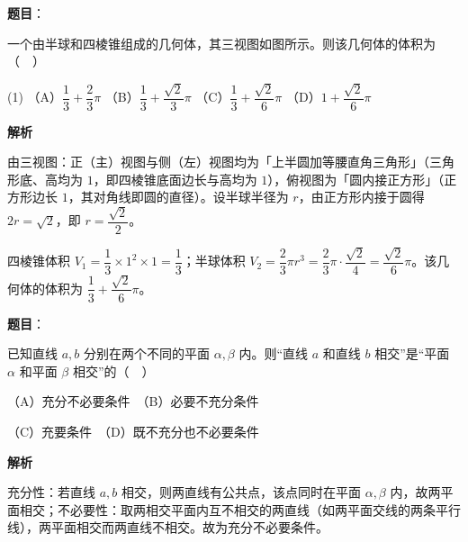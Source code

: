 \begin{answer}

\textbf{题目}：

一个由半球和四棱锥组成的几何体，其三视图如图所示。则该几何体的体积为（　）
\nopagebreak[4]
\begin{center}\end{center}
\nopagebreak[4]
\begin{gkopts}(1)
\task （A）\(\dfrac{1}{3}+\dfrac{2}{3}\pi\)
\task （B）\(\dfrac{1}{3}+\dfrac{\sqrt{2}}{3}\pi\)
\task （C）\(\dfrac{1}{3}+\dfrac{\sqrt{2}}{6}\pi\)
\task （D）\(1+\dfrac{\sqrt{2}}{6}\pi\)
\end{gkopts}

\textbf{解析}

由三视图：正（主）视图与侧（左）视图均为「上半圆加等腰直角三角形」（三角形底、高均为 \(1\)，即四棱锥底面边长与高均为 \(1\)），俯视图为「圆内接正方形」（正方形边长 \(1\)，其对角线即圆的直径）。设半球半径为 \(r\)，由正方形内接于圆得 \(2r=\sqrt{2}\)，即 \(r=\dfrac{\sqrt{2}}{2}\)。

四棱锥体积 \(V_{1}=\dfrac{1}{3}\times 1^{2}\times 1=\dfrac{1}{3}\)；半球体积 \(V_{2}=\dfrac{2}{3}\pi r^{3}=\dfrac{2}{3}\pi\cdot\dfrac{\sqrt{2}}{4}=\dfrac{\sqrt{2}}{6}\pi\)。该几何体的体积为 \(\dfrac{1}{3}+\dfrac{\sqrt{2}}{6}\pi\)。


\end{answer}
\begin{answer}

\textbf{题目}：

已知直线 \(a,b\) 分别在两个不同的平面 \(\alpha,\beta\) 内。则“直线 \(a\) 和直线 \(b\) 相交”是“平面 \(\alpha\) 和平面 \(\beta\) 相交”的（　）

（A）充分不必要条件　（B）必要不充分条件

（C）充要条件　（D）既不充分也不必要条件

\textbf{解析}

充分性：若直线 \(a,b\) 相交，则两直线有公共点，该点同时在平面 \(\alpha,\beta\) 内，故两平面相交；不必要性：取两相交平面内互不相交的两直线（如两平面交线的两条平行线），两平面相交而两直线不相交。故为充分不必要条件。


\end{answer}
